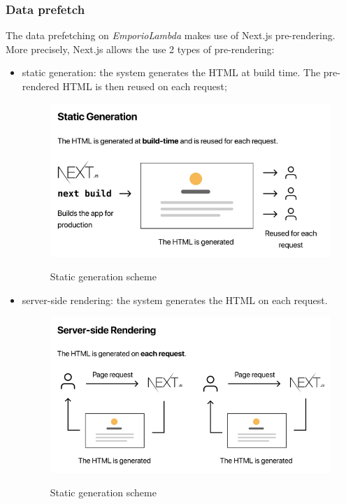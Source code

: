 \subsubsection{Data prefetch}
The data prefetching on \textit{EmporioLambda} makes use of Next.js pre-rendering.\\
More precisely, Next.js allows the use 2 types of pre-rendering:
\begin{itemize}
\item static generation: the system generates the HTML at build time. The pre-rendered HTML is then reused on each request;
\begin{figure}[H]
\centering
\includegraphics[scale=0.70]{res/Architettura/Frontend/img/staticGeneration}\\
\caption{Static generation scheme}
\end{figure}
\vspace{0.7cm}
\item server-side rendering: the system generates the HTML on each request.
\begin{figure}[H]
\centering
\includegraphics[scale=0.70]{res/Architettura/Frontend/img/serverSideRendering}\\
\caption{Static generation scheme}
\end{figure}
\vspace{0.7cm}
\end{itemize}
